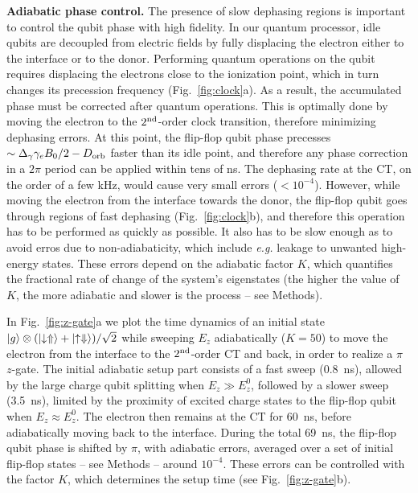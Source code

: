 \documentclass[aps,prb,superscriptaddress,nobibnotes,preprint]{revtex4-1}%
\begin{document}
\vspace{3mm}
\noindent\textbf{Adiabatic phase control.} The presence of slow dephasing regions is important to control the qubit phase with high fidelity. In our quantum processor, idle qubits are decoupled from electric fields by fully displacing the electron either to the interface or to the donor. Performing quantum operations on the qubit requires displacing the electrons close to the ionization point, which in turn changes its precession frequency (Fig.~\ref{fig:clock}a). As a result, the accumulated phase must be corrected after quantum operations. This is optimally done by moving the electron to the $2^{\rm nd}$-order clock transition, therefore minimizing dephasing errors. At this point, the flip-flop qubit phase precesses $\sim\Delta_\gamma\gamma_e B_0/2-D_{\rm orb}$ faster than its idle point, and therefore any phase correction in a $2\pi$ period can be applied within tens of ns. The dephasing rate at the CT, on the order of a few kHz, would cause very small errors ($<10^{-4}$). However, while moving the electron from the interface towards the donor, the flip-flop qubit goes through regions of fast dephasing (Fig.~\ref{fig:clock}b), and therefore this operation has to be performed as quickly as possible. It also has to be slow enough as to avoid erros due to non-adiabaticity, which include \textit{e.g.} leakage to unwanted high-energy states. These errors depend on the adiabatic factor $K$, which quantifies the fractional rate of change of the system's eigenstates (the higher the value of $K$, the more adiabatic and slower is the process -- see Methods).

In Fig.~\ref{fig:z-gate}a we plot the time dynamics of an initial state $\ket{g}\otimes(\ket{\downarrow\Uparrow}+\ket{\uparrow\Downarrow})/\sqrt{2}$ while sweeping $E_z$ adiabatically ($K=50$) to move the electron from the interface to the $2^{\rm nd}$-order CT and back, in order to realize a $\pi$ $z$-gate. The initial adiabatic setup part consists of a fast sweep (0.8~ns), allowed by the large charge qubit splitting when $E_z \gg E_z^0$, followed by a slower sweep (3.5~ns), limited by the proximity of excited charge states to the flip-flop qubit when $E_z \approx E_z^0$. The electron then remains at the CT for 60~ns, before adiabatically moving back to the interface. During the total 69~ns, the flip-flop qubit phase is shifted by $\pi$, with adiabatic errors, averaged over a set of initial flip-flop states -- see Methods -- around $10^{-4}$. These errors can be controlled with the factor $K$, which determines the setup time (see Fig.~\ref{fig:z-gate}b).
\end{document}
